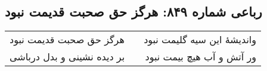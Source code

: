 \begin{center}
\section*{رباعی شماره ۸۴۹: هرگز حق صحبت قدیمت نبود}
\label{sec:0849}
\begin{longtable}{l p{0.5cm} r}
هرگز حق صحبت قدیمت نبود
&&
واندیشهٔ این سیه گلیمت نبود
\\
بر دیده نشینی و بدل درباشی
&&
ور آتش و آب هیچ بیمت نبود
\\
\end{longtable}
\end{center}
